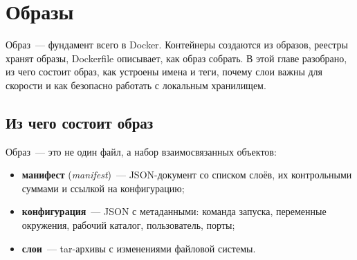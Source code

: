 \chapter{Образы}

Образ~--- фундамент всего в Docker. Контейнеры создаются из образов,
реестры хранят образы, Dockerfile описывает, как образ собрать.
В этой главе разобрано, из чего состоит образ, как устроены имена и теги,
почему слои важны для скорости и как безопасно работать с локальным
хранилищем.

\section{Из чего состоит образ}

Образ~--- это не один файл, а набор взаимосвязанных объектов:

\begin{itemize}
  \item \textbf{манифест} (\emph{manifest})~--- JSON-документ со списком слоёв,
        их контрольными суммами и ссылкой на конфигурацию;
  \item \textbf{конфигурация}~--- JSON с метаданными: команда запуска,
        переменные окружения, рабочий каталог, пользователь, порты;
  \item \textbf{слои}~--- tar-архивы с изменениями файловой системы.
\end{itemize}

